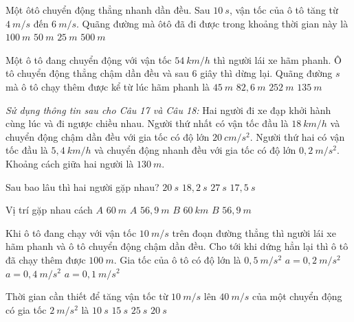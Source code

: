 \begin{ex}%
Một ôtô chuyển động thẳng nhanh dần đều. Sau $10\ s$, vận tốc của ô tô tăng từ $4\ m/s$ đến $6 \ m/s$. Quãng đường mà ôtô đã đi được trong khoảng thời gian này là
\choice
{$100 \ m$}
{\True $50 \ m$}
{$25\ m$}
{$500\ m$}
\loigiai{}
\end{ex}
\begin{ex}%
Một ô tô đang chuyển động với vận tốc $54 \ km/h$ thì người lái xe hãm phanh. Ô tô chuyển động thẳng chậm dần đều và sau $6$ giây thì dừng lại. Quãng đường $s$ mà ô tô chạy thêm được kể từ lúc hãm phanh là
\choice
{\True $45 \ m$}
{$82,6 \ m$}
{$252 \ m$}
{$135\ m$}
\loigiai{}
\end{ex}










\textit{Sử dụng thông tin sau cho Câu 17 và Câu 18:} Hai người đi xe đạp khởi hành cùng lúc và đi ngược chiều nhau. Người thứ nhất có vận tốc đầu là $18 \ km/h$ và chuyển động chậm dần đều với gia tốc có độ lớn $20\ cm/s^2$. Người thứ hai có vận tốc đầu là $5,4 \ km/h$ và chuyển động nhanh đều với gia tốc có độ lớn $0,2 \ m/s^2$. Khoảng cách giữa hai người là $130\ m$.
\begin{ex}%
Sau bao lâu thì hai người gặp nhau? 
\choice
{\True $20 \ s$}
{$18,2 \ s$}
{$27\ s$}
{$17,5 \ s$}
\loigiai{}
\end{ex}
\begin{ex}%
Vị trí gặp nhau cách 
\choice
{\True $A$ $60\ m$}
{$A$ $56,9\ m$}
{$B$ $60\ km$}
{$B$ $56,9\ m$}
\loigiai{}
\end{ex}
\begin{ex}%
Khi ô tô đang chạy với vận tốc $10 \ m/s$ trên đoạn đường thẳng thì người lái xe hãm phanh và ô tô chuyển động chậm dần đều. Cho tới khi dứng hẳn lại thì ô tô đã chạy thêm được $100\ m$. Gia tốc của ô tô có độ lớn là
\choice
{\True $0,5 \ m/s^2$}
{$a=0,2 \ m/s^2$}
{$a=0,4 \ m/s^2$}
{$a=0,1\ m/s^2$}
\loigiai{}
\end{ex}
\begin{ex}%
Thời gian cần thiết để tăng vận tốc từ $10 \ m/s$ lên $40 \ m/s$ của một chuyển động có gia tốc $2 \ m/s^2$ là
\choice
{$10\ s$}
{\True $15\ s$}
{$25\ s$}
{$20\ s$}
\loigiai{}
\end{ex}

